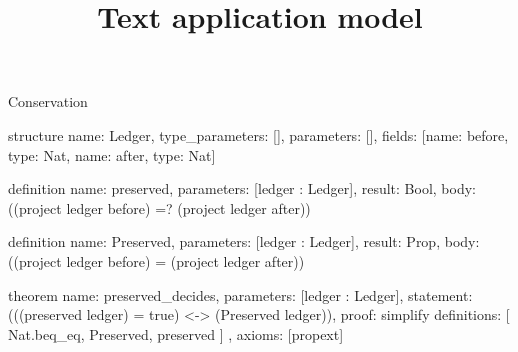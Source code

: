 \begin{lexlean}{Conservation}
\title{Text application model}
\begin{semanticmodule}
structure{
  name: Ledger,
  type_parameters: [],
  parameters: [],
  fields: [{name: before, type: Nat}, {name: after, type: Nat}]
}

definition{
  name: preserved,
  parameters: [ledger : Ledger],
  result: Bool,
  body: ((project ledger before) =? (project ledger after))
}

definition{
  name: Preserved,
  parameters: [ledger : Ledger],
  result: Prop,
  body: ((project ledger before) = (project ledger after))
}

theorem{
  name: preserved_decides,
  parameters: [ledger : Ledger],
  statement: (((preserved ledger) = true) <-> (Preserved ledger)),
  proof: simplify{
    definitions: [
      Nat.beq_eq,
      Preserved,
      preserved
    ]
  },
  axioms: [propext]
}
\end{semanticmodule}
\end{lexlean}
